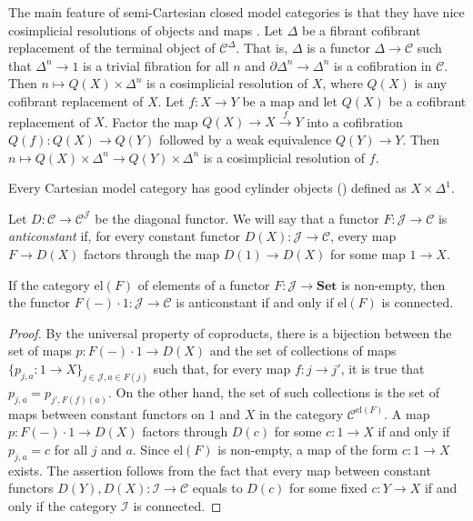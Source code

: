 \documentclass[reqno]{amsart}
\theoremstyle{definition}
\theoremstyle{remark}
\newcommand{\fs}[1]{\mathrm{#1}}
\newcommand{\cat}[1]{\mathbf{#1}}
\newcommand{\scat}[1]{\mathcal{#1}}
\newcommand{\Set}{\cat{Set}}
\numberwithin{figure}{section}
\begin{document}
The main feature of semi-Cartesian closed model categories is that they have nice cosimplicial resolutions of objects and maps \cite[Definition~16.1.2, Definition~16.1.20]{hirschhorn}.
Let $\Delta$ be a fibrant cofibrant replacement of the terminal object of $\scat{C}^\Delta$.
That is, $\Delta$ is a functor $\Delta \to \scat{C}$ such that $\Delta^n \to 1$ is a trivial fibration for all $n$ and $\partial \Delta^n \to \Delta^n$ is a cofibration in $\scat{C}$.
Then $n \mapsto Q(X) \times \Delta^n$ is a cosimplicial resolution of $X$, where $Q(X)$ is any cofibrant replacement of $X$.
Let $f : X \to Y$ be a map and let $Q(X)$ be a cofibrant replacement of $X$.
Factor the map $Q(X) \to X \xrightarrow{f} Y$ into a cofibration $Q(f) : Q(X) \to Q(Y)$ followed by a weak equivalence $Q(Y) \to Y$.
Then $n \mapsto Q(X) \times \Delta^n \to Q(Y) \times \Delta^n$ is a cosimplicial resolution of $f$.

\begin{remark}
Every Cartesian model category has good cylinder objects () defined as $X \times \Delta^1$.
\end{remark}

Let $D : \scat{C} \to \scat{C}^\scat{J}$ be the diagonal functor.
We will say that a functor $F : \scat{J} \to \scat{C}$ is \emph{anticonstant} if, for every constant functor $D(X) : \scat{J} \to \scat{C}$, every map $F \to D(X)$ factors through the map $D(1) \to D(X)$ for some map $1 \to X$.

\begin{lem}
If the category $\fs{el}(F)$ of elements of a functor $F : \scat{J} \to \Set$ is non-empty, then the functor $F(-) \cdot 1 : \scat{J} \to \scat{C}$ is anticonstant if and only if $\fs{el}(F)$ is connected.
\end{lem}
\begin{proof}
By the universal property of coproducts, there is a bijection between the set of maps $p : F(-) \cdot 1 \to D(X)$ and the set of collections of maps $\{ p_{j,a} : 1 \to X \}_{j \in \scat{J}, a \in F(j)}$ such that,
for every map $f : j \to j'$, it is true that $p_{j,a} = p_{j',F(f)(a)}$.
On the other hand, the set of such collections is the set of maps between constant functors on $1$ and $X$ in the category $\scat{C}^{\fs{el}(F)}$.
A map $p : F(-) \cdot 1 \to D(X)$ factors through $D(c)$ for some $c : 1 \to X$ if and only if $p_{j,a} = c$ for all $j$ and $a$.
Since $\fs{el}(F)$ is non-empty, a map of the form $c : 1 \to X$ exists.
The assertion follows from the fact that every map between constant functors $D(Y), D(X) : \scat{I} \to \scat{C}$ equals to $D(c)$ for some fixed $c : Y \to X$ if and only if the category $\scat{I}$ is connected.
\end{proof}
\end{document}

